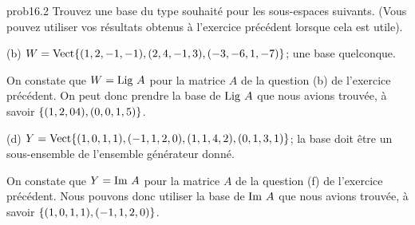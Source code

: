 \bigskip
\begin{sol}{prob16.2}  Trouvez une base du type souhaité pour les sous-espaces suivants. (Vous pouvez utiliser vos résultats obtenus à l'exercice précédent lorsque cela est utile).
\medskip

(b) $W=\sp{(1,2,-1,-1),(2,4,-1,3),(-3,-6,1,-7)}$; une base quelconque.

\soln On constate que $W= \row A$ pour la matrice $A$ de la question (b) de l'exercice précédent. On peut donc prendre la base de $\row A$ que nous avions trouvée, à savoir $\set{(1,2,04),(0,0,1,5)}$.
\medskip

(d) $Y=\sp{(1,0,1,1), (-1,1,2,0), (1,1,4,2), (0,1,3,1)}$; la base doit \^etre un sous-ensemble de l'ensemble g\'en\'erateur donn\'e.

\soln On constate que $Y= \im A$ pour la matrice $A$ de la question (f) de l'exercice précédent. Nous pouvons donc utiliser la base de $\im A$ que nous avions trouvée, à savoir $ \set{(1,0,1,1),(-1,1,2,0)}$.



\medskip 
\end{sol}

